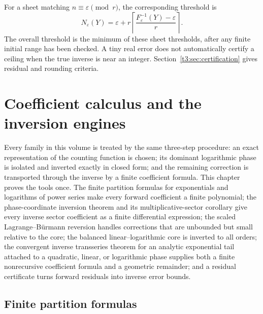 \documentclass[11pt,openany]{book}
\numberwithin{equation}{chapter}
\theoremstyle{plain}
\theoremstyle{definition}
\theoremstyle{remark}
\newcommand{\eps}{\varepsilon}
\begin{document}
For a sheet matching $n\equiv\eps\pmod r$, the corresponding threshold is
\begin{equation}\label{t3:eq:residue-rounding}
 N_{\eps}(Y)=\eps+r\left\lceil\frac{F_{\eps}^{-1}(Y)-\eps}{r}\right\rceil.
\end{equation}
The overall threshold is the minimum of these sheet thresholds, after any finite initial range has been checked. A tiny real error does not automatically certify a ceiling when the true inverse is near an integer. Section~\ref{t3:sec:certification} gives residual and rounding criteria.

\chapter{Coefficient calculus and the inversion engines}
\label{ct:ch:engines}

Every family in this volume is treated by the same three-step procedure:
an exact representation of the counting function is chosen; its dominant
logarithmic phase is isolated and inverted exactly in closed form; and the
remaining correction is transported through the inverse by a finite
coefficient formula.  This chapter proves the tools once.  The finite
partition formulas for exponentials and logarithms of power series make
every forward coefficient a finite polynomial; the phase-coordinate
inversion theorem and its multiplicative-sector corollary give every
inverse sector coefficient as a finite differential expression; the scaled
Lagrange--B\"urmann reversion handles corrections that are unbounded but
small relative to the core; the balanced linear--logarithmic core is
inverted to all orders; the convergent inverse transseries theorem for an
analytic exponential tail attached to a quadratic, linear, or logarithmic
phase supplies both a finite nonrecursive coefficient formula and a
geometric remainder; and a residual certificate turns forward residuals
into inverse error bounds.

\section{Finite partition formulas}
\label{ct:sec:partition-formulas}
\end{document}
